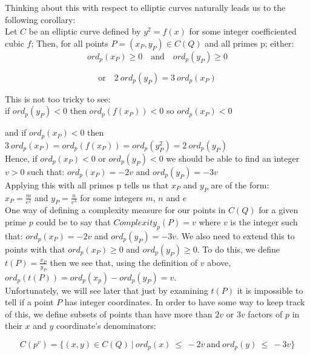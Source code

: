 \documentclass{article}
\begin{document}
Thinking about this with respect to elliptic curves naturally leads us to the following corollary:\\

Let $C$ be an elliptic curve defined by $y^2 = f(x)$ for some integer coefficiented cubic $f$; Then, for all points $P = (x_P, y_P) \in C(Q)$ and all primes p; either:\\

\[ ord_p(x_P) \geq 0 \quad \text{and} \quad  ord_p(y_P) \geq 0 \]

\[ \text{or} \quad  2 \ ord_p(y_P) = 3 \ ord_p(x_P) \]

This is not too tricky to see:\\

if \quad $ord_p(y_P) < 0$ \quad then \quad $ord_p(f(x_P)) < 0$ \quad so \quad $ord_p(x_P) < 0$

and if \quad $ord_p(x_P) < 0$ \quad then \quad $3 \ ord_p(x_P) = ord_p(f(x_P)) = ord_p(y_P^2) = 2 \ ord_p(y_P)$\\

Hence, if $ord_p(x_P) < 0$ or $ord_p(y_P) < 0$ we should be able to find an integer $v > 0$ such that: $ord_p(x_P) = -2v$ and $ord_p(y_P) = -3v$\\

Applying this with all primes p tells us that $x_P$ and $y_P$ are of the form:\\

$x_P = \frac{m}{e^2}$ \quad and \quad $y_P = \frac{n}{e^3}$ for some integers $m$, $n$ and $e$\\

One way of defining a complexity measure for our points in $C(Q)$ for a given prime $p$ could be to say that $Complexity_p(P) = v$ where $v$ is the integer such that:  $ord_p(x_P) = -2v$ and $ord_p(y_P) = -3v$. We also need to extend this to points with that $ord_p(x_P) \geq 0$ and $ord_p(y_P) \geq 0$. To do this, we define $t(P) = \frac{x_P}{y_P}$ then we see that, using the definition of $v$ above, $ord_p(t(P)) = ord_p(x_p) - ord_p(y_P) = v$. \\ 

Unfortunately, we will see later that just by examining $t(P)$ it is impossible to tell if a point $P$ has integer coordinates. In order to have some way to keep track of this, we define subsets of points than have more than $2v$ or $3v$ factors of $p$ in their $x$ and $y$ coordinate's denominators:

\[ C(p^v) = \{(x, y) \in C(Q) \ | \ ord_p(x) \ \leq \ -2v \ \text{and} \ ord_p(y) \ \leq \ -3v\} \]
\end{document}
